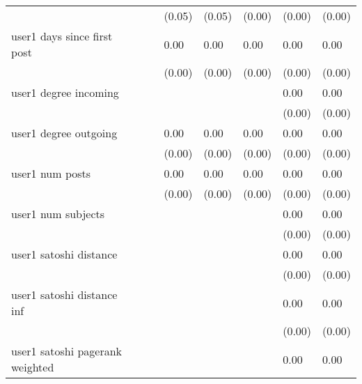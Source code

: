 \begin{table}
\begin{center}
\begin{tabular}{llllllll}
                                               &         &         & (0.05)  & (0.05)  & (0.00)   & (0.00)    & (0.00)   \\
user1 days since first post                    &         &         & 0.00    & 0.00    & 0.00     & 0.00      & 0.00     \\
                                               &         &         & (0.00)  & (0.00)  & (0.00)   & (0.00)    & (0.00)   \\
user1 degree incoming                          &         &         &         &         &          & 0.00      & 0.00     \\
                                               &         &         &         &         &          & (0.00)    & (0.00)   \\
user1 degree outgoing                          &         &         & 0.00    & 0.00    & 0.00     & 0.00      & 0.00     \\
                                               &         &         & (0.00)  & (0.00)  & (0.00)   & (0.00)    & (0.00)   \\
user1 num posts                                &         &         & 0.00    & 0.00    & 0.00     & 0.00      & 0.00     \\
                                               &         &         & (0.00)  & (0.00)  & (0.00)   & (0.00)    & (0.00)   \\
user1 num subjects                             &         &         &         &         &          & 0.00      & 0.00     \\
                                               &         &         &         &         &          & (0.00)    & (0.00)   \\
user1 satoshi distance                         &         &         &         &         &          & 0.00      & 0.00     \\
                                               &         &         &         &         &          & (0.00)    & (0.00)   \\
user1 satoshi distance inf                     &         &         &         &         &          & 0.00      & 0.00     \\
                                               &         &         &         &         &          & (0.00)    & (0.00)   \\
user1 satoshi pagerank weighted                &         &         &         &         &          & 0.00      & 0.00     \\

\end{tabular}
\end{center}
\end{table}
